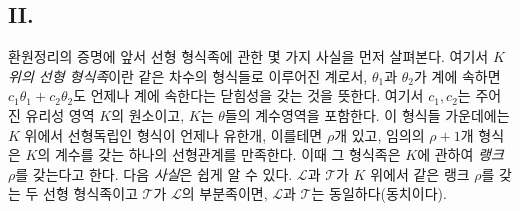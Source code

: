 
\subsection*{II.}
환원정리의 증명에 앞서 선형 형식족에 관한 몇 가지 사실을 먼저 살펴본다. 여기서 \emph{$K$ 위의 선형 형식족}이란 같은 차수의 형식들로 이루어진 계로서, $\theta_1$과 $\theta_2$가 계에 속하면 $c_1\theta_1+c_2\theta_2$도 언제나 계에 속한다는 닫힘성을 갖는 것을 뜻한다. 여기서 $c_1,c_2$는 주어진 유리성 영역 $K$의 원소이고, $K$는 $\theta$들의 계수영역을 포함한다. 이 형식들 가운데에는 $K$ 위에서 선형독립인 형식이 언제나 유한개, 이를테면 $\rho$개 있고, 임의의 $\rho+1$개 형식은 $K$의 계수를 갖는 하나의 선형관계를 만족한다. 이때 그 형식족은 $K$에 관하여 \emph{랭크 $\rho$}를 갖는다고 한다. 다음 \emph{사실}은 쉽게 알 수 있다. $\mathcal L$과 $\mathcal T$가 $K$ 위에서 같은 랭크 $\rho$를 갖는 두 선형 형식족이고 $\mathcal T$가 $\mathcal L$의 부분족이면, $\mathcal L$과 $\mathcal T$는 동일하다(동치이다).
